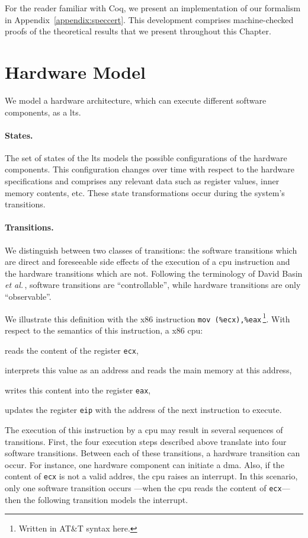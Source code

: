 For the reader familiar with Coq, we present an implementation of our formalism
in Appendix~\ref{appendix:speccert}.
%
This development comprises machine-checked proofs of the theoretical results
that we present throughout this Chapter.

\section{Hardware Model}
\label{sec:speccert:hardware}

We model a hardware architecture, which can execute different software
components, as a \ac{lts}.

\paragraph{States.}
%
The set of states of the \ac{lts} models the possible configurations of the
hardware components.
%
This configuration changes over time with respect to the hardware specifications
and comprises any relevant data such as register values, inner memory contents,
etc.
%
These state transformations occur during the system's transitions.

\paragraph{Transitions.}
%
We distinguish between two classes of transitions: the software transitions
which are direct and foreseeable side effects of the execution of a \ac{cpu}
instruction and the hardware transitions which are not.
%
Following the terminology of David Basin \emph{et
  al.}\,\cite{basin2013enforceable}, software transitions are ``controllable'',
while hardware transitions are only ``observable''.

We illustrate this definition with the x86 instruction \texttt{mov
  (\%ecx),\%eax}\,\footnote{Written in AT\&T syntax here.}.
%
With respect to the semantics of this instruction, a x86 \ac{cpu}:
%
\begin{inparaenum}[(1)]
\item reads the content of the register \texttt{ecx},
%
\item interprets this value as an address and reads the main memory at this
  address,
%
\item writes this content into the register \texttt{eax},
%
\item updates the register \texttt{eip} with the address of the next instruction
  to execute.
\end{inparaenum}
%
The execution of this instruction by a \ac{cpu} may result in several sequences
of transitions.
%
First, the four execution steps described above translate into four software
transitions.
%
Between each of these transitions, a hardware transition can occur.
%
For instance, one hardware component can initiate a \ac{dma}.
%
Also, if the content of \texttt{ecx} is not a valid addres, the \ac{cpu} raises
an interrupt.
%
In this scenario, only one software transition occurs ---when the \ac{cpu} reads
the content of \texttt{ecx}--- then the following transition models the
interrupt.

